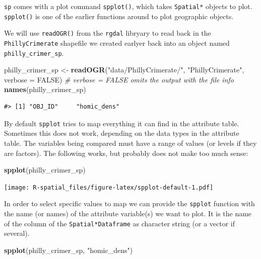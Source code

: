 \documentclass[]{book}
\newenvironment{Shaded}{\begin{snugshade}}{\end{snugshade}}
\newcommand{\KeywordTok}[1]{\textcolor[rgb]{0.13,0.29,0.53}{\textbf{#1}}}
\newcommand{\DataTypeTok}[1]{\textcolor[rgb]{0.13,0.29,0.53}{#1}}
\newcommand{\StringTok}[1]{\textcolor[rgb]{0.31,0.60,0.02}{#1}}
\newcommand{\CommentTok}[1]{\textcolor[rgb]{0.56,0.35,0.01}{\textit{#1}}}
\newcommand{\OtherTok}[1]{\textcolor[rgb]{0.56,0.35,0.01}{#1}}
\newcommand{\NormalTok}[1]{#1}
\theoremstyle{definition}
\theoremstyle{definition}
\theoremstyle{definition}
\theoremstyle{remark}
\begin{document}
\texttt{sp} comes with a plot command \texttt{spplot()}, which takes
\texttt{Spatial*} objects to plot. \texttt{spplot()} is one of the
earlier functions around to plot geographic objects.

We will use \texttt{readOGR()} from the \texttt{rgdal} libryary to read
back in the \texttt{PhillyCrimerate} shapefile we created earlyer back
into an object named \texttt{philly\_crimer\_sp}.

\begin{Shaded}
\begin{Highlighting}[]
\NormalTok{philly_crimer_sp <-}\StringTok{ }\KeywordTok{readOGR}\NormalTok{(}\StringTok{"data/PhillyCrimerate/"}\NormalTok{, }\StringTok{"PhillyCrimerate"}\NormalTok{, }\DataTypeTok{verbose =} \OtherTok{FALSE}\NormalTok{) }\CommentTok{# verbose = FALSE omits the output with the file info}
\KeywordTok{names}\NormalTok{(philly_crimer_sp)}
\end{Highlighting}
\end{Shaded}

\begin{verbatim}
#> [1] "OBJ_ID"     "homic_dens"
\end{verbatim}

By default \texttt{spplot} tries to map everything it can find in the
attribute table. Sometimes this does not work, depending on the data
types in the attribute table. The variables being compared must have a
range of values (or levels if they are factors). The following works,
but probably does not make too much sense:

\begin{Shaded}
\begin{Highlighting}[]
\KeywordTok{spplot}\NormalTok{(philly_crimer_sp)}
\end{Highlighting}
\end{Shaded}

\texttt{[image: R-spatial\_files/figure-latex/spplot-default-1.pdf]}

In order to select specific values to map we can provide the
\texttt{spplot} function with the name (or names) of the attribute
variable(s) we want to plot. It is the name of the column of the
\texttt{Spatial*Dataframe} as character string (or a vector if several).

\begin{Shaded}
\begin{Highlighting}[]
\KeywordTok{spplot}\NormalTok{(philly_crimer_sp, }\StringTok{"homic_dens"}\NormalTok{)}
\end{Highlighting}
\end{Shaded}
\end{document}

